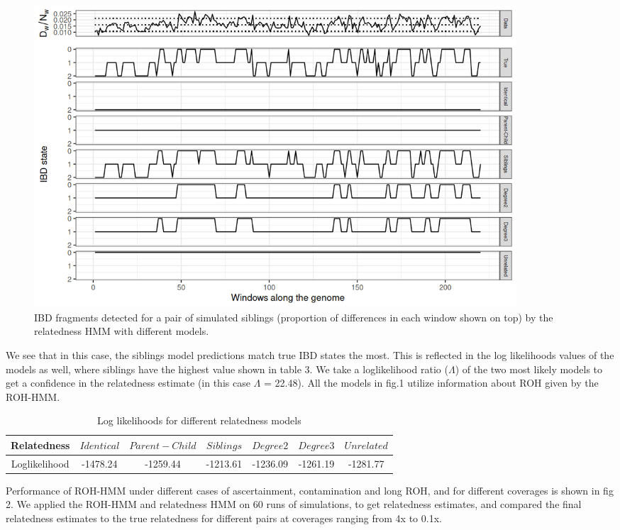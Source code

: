 \documentclass[12pt, letterpaper]{article}
\begin{document}
\begin{figure}[htp]
    \centering
    \includegraphics[width=18cm]{plots/plotimg/IBDplot.png}
    \caption{IBD fragments detected for a pair of simulated siblings (proportion of differences in each window shown on top) by the relatedness HMM with different models.}
    \label{fig:ibd}
\end{figure}


We see that in this case, the siblings model predictions match true IBD states the most. This is reflected in the log likelihoods values of the models as well, where siblings have the highest value shown in table 3. We take a loglikelihood ratio ($\Lambda$) of the two most likely models to get a confidence in the relatedness estimate (in this case $\Lambda$ = 22.48). All the models in fig.1 utilize information about ROH given by the ROH-HMM. 


\begin{table}
\caption{\label{tab:Table 3}Log likelihoods for different relatedness models}
\begin{tabular}{|c|c|c|c|c|c|c|}
    \hline
    Relatedness & $Identical$ & $Parent-Child$ & $Siblings$ & $Degree2$ & $Degree3$ & $Unrelated$\\
    \hline
    Loglikelihood & -1478.24 & -1259.44 & -1213.61 & -1236.09 & -1261.19 & -1281.77\\
    \hline
   
\end{tabular}

\end{table}


Performance of ROH-HMM under different cases of ascertainment, contamination and long ROH, and for different coverages is shown in fig 2. We applied the ROH-HMM and relatedness HMM on 60 runs of simulations, to get relatedness estimates, and compared the final relatedness estimates to the true relatedness for different pairs at coverages ranging from 4x to 0.1x. 
\end{document}
